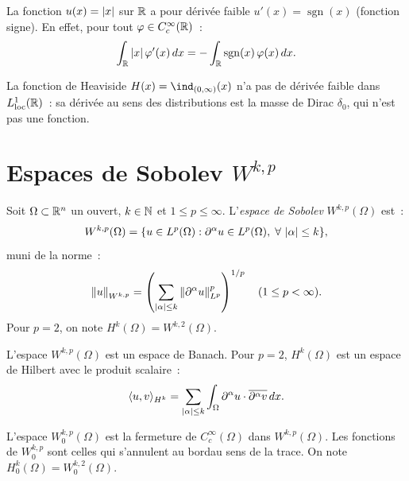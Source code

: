 \begin{exemple}
La fonction $u(x) = \left| x \right|$ sur $\mathbb{R}$ a pour d\'eriv\'ee faible
$u'(x) = \operatorname{sgn}(x)$ (fonction signe). En effet, pour tout
$\varphi \in C_c^\infty(\mathbb{R})$~:
\[
    \int_{\mathbb{R}} \left| x \right| \varphi'(x)\, dx = -\int_{\mathbb{R}} \operatorname{sgn}(x)\, \varphi(x)\, dx.
\]
\end{exemple}

\begin{exemple}
La fonction de Heaviside $H(x) = \ind_{(0,\infty)}(x)$ n'a pas de d\'eriv\'ee faible
dans $L^1_{\mathrm{loc}}(\mathbb{R})$~: sa d\'eriv\'ee au sens des distributions est la
masse de Dirac $\delta_0$, qui n'est pas une fonction.
\end{exemple}

\section{Espaces de Sobolev $W^{k,p}$}

\begin{definition}
Soit $\Omega \subset \mathbb{R}^n$ un ouvert, $k \in \mathbb{N}$ et $1 \leq p \leq \infty$.
L'\emph{espace de Sobolev} $W^{k,p}(\Omega)$ est~:
\[
    W^{k,p}(\Omega) = \{ u \in L^p(\Omega) : \partial^\alpha u \in L^p(\Omega),\;
    \forall\, \left| \alpha \right| \leq k \},
\]
muni de la norme~:
\[
    \left\| u \right\|_{W^{k,p}} = \left( \sum_{\left| \alpha \right| \leq k}
    \left\| \partial^\alpha u \right\|_{L^p}^p \right)^{1/p}
    \quad (1 \leq p < \infty).
\]
Pour $p = 2$, on note $H^k(\Omega) = W^{k,2}(\Omega)$.
\end{definition}

\begin{theoreme}
L'espace $W^{k,p}(\Omega)$ est un espace de Banach. Pour $p = 2$, $H^k(\Omega)$
est un espace de Hilbert avec le produit scalaire~:
\[
    \langle u, v \rangle_{H^k} = \sum_{\left| \alpha \right| \leq k} \int_\Omega
    \partial^\alpha u \cdot \overline{\partial^\alpha v}\, dx.
\]
\end{theoreme}

\begin{definition}
L'espace $W_0^{k,p}(\Omega)$ est la fermeture de $C_c^\infty(\Omega)$ dans
$W^{k,p}(\Omega)$. Les fonctions de $W_0^{k,p}$ sont celles qui \og{}s'annulent
au bord\fg au sens de la trace. On note $H_0^k(\Omega) = W_0^{k,2}(\Omega)$.
\end{definition}

